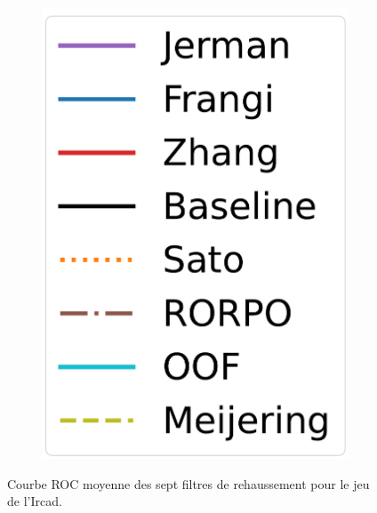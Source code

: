 \begin{figure}[!ht]
\begin{subfigure}[t]{0.2\textwidth}
      \includegraphics[width=\textwidth,clip = true]{Images/standAloneLegend.pdf}
  \end{subfigure}

  \caption{Courbe ROC moyenne des sept filtres de rehaussement pour le jeu de l'Ircad.}
  \label{fig:Ircad_ROC}
\end{figure}

